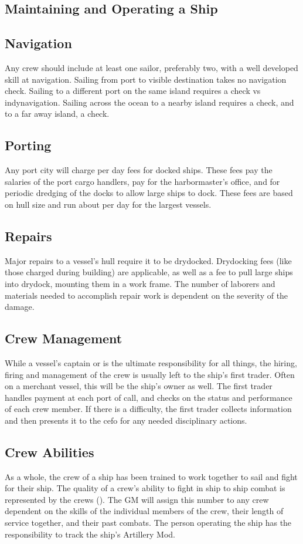 \begin{multicols*}{2}
\section{Maintaining and Operating a Ship}
\subsection{Navigation}
Any crew should include at least one sailor, preferably two, with a well developed skill at navigation. Sailing from port to visible destination takes no navigation check. Sailing to a different port on the same island requires a  check vs indy{navigation}. Sailing across the ocean to a nearby island requires a  check, and to a far away island, a  check.
\subsection{Porting}
Any port city will charge per day fees for docked ships. These fees pay the salaries of the port cargo handlers, pay for the harbormaster’s office, and for periodic dredging of the docks to allow large ships to dock. These fees are based on hull size and run about  per day for the largest vessels.
\subsection{Repairs}
Major repairs to a vessel’s hull require it to be drydocked. Drydocking fees (like those charged during building) are applicable, as well as a  fee to pull large ships into drydock, mounting them in a work frame. The number of laborers and materials needed to accomplish repair work is dependent on the severity of the damage.
\subsection{Crew Management}
While a vessel’s captain or  is the ultimate responsibility for all things, the hiring, firing and management of the crew is usually left to the ship’s first trader. Often on a merchant vessel, this will be the ship’s owner as well. The first trader handles payment at each port of call, and checks on the status and performance of each crew member. If there is a difficulty, the first trader collects information and then presents it to the cefo for any needed disciplinary actions.
\subsection{Crew Abilities}
As a whole, the crew of a ship has been trained to work together to sail and fight for their ship. The quality of a crew’s ability to fight in ship to ship combat is represented by
the crews  (\AM). The GM will assign this number to any crew dependent on the skills of the individual members of the crew, their length of service together, and their past combats. The person operating the ship has the responsibility to track the ship’s Artillery Mod.

\end{multicols*}
